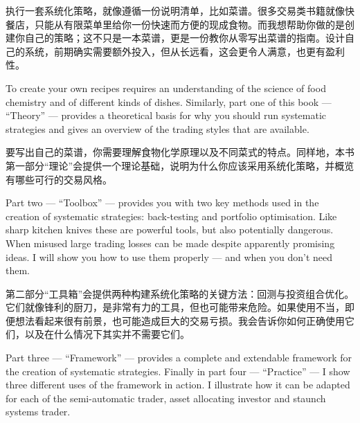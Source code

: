 \begin{chineseblock}执行一套系统化策略，就像遵循一份说明清单，比如菜谱。很多交易类书籍就像快餐店，只能从有限菜单里给你一份快速而方便的现成食物。而我想帮助你做的是创建你自己的策略；这不只是一本菜谱，更是一份教你从零写出菜谱的指南。设计自己的系统，前期确实需要额外投入，但从长远看，这会更令人满意，也更有盈利性。\end{chineseblock}

\bipairgap

\begin{englishblock} To create your own recipes requires an understanding of the science of food chemistry and of different kinds of dishes. Similarly, part one of this book --- ``Theory'' --- provides a theoretical basis for why you should run systematic strategies and gives an overview of the trading styles that are available. \end{englishblock}

\begin{chineseblock}要写出自己的菜谱，你需要理解食物化学原理以及不同菜式的特点。同样地，本书第一部分“理论”会提供一个理论基础，说明为什么你应该采用系统化策略，并概览有哪些可行的交易风格。\end{chineseblock}

\bipairgap

\begin{englishblock} Part two --- ``Toolbox'' --- provides you with two key methods used in the creation of systematic strategies: back-testing and portfolio optimisation. Like sharp kitchen knives these are powerful tools, but also potentially dangerous. When misused large trading losses can be made despite apparently promising ideas. I will show you how to use them properly --- and when you don't need them. \end{englishblock}

\begin{chineseblock}第二部分“工具箱”会提供两种构建系统化策略的关键方法：回测与投资组合优化。它们就像锋利的厨刀，是非常有力的工具，但也可能带来危险。如果使用不当，即便想法看起来很有前景，也可能造成巨大的交易亏损。我会告诉你如何正确使用它们，以及在什么情况下其实并不需要它们。\end{chineseblock}

\bipairgap

\begin{englishblock} Part three --- ``Framework'' --- provides a complete and extendable framework for the creation of systematic strategies. Finally in part four --- ``Practice'' --- I show three different uses of the framework in action. I illustrate how it can be adapted for each of the semi-automatic trader, asset allocating investor and staunch systems trader. \end{englishblock}

